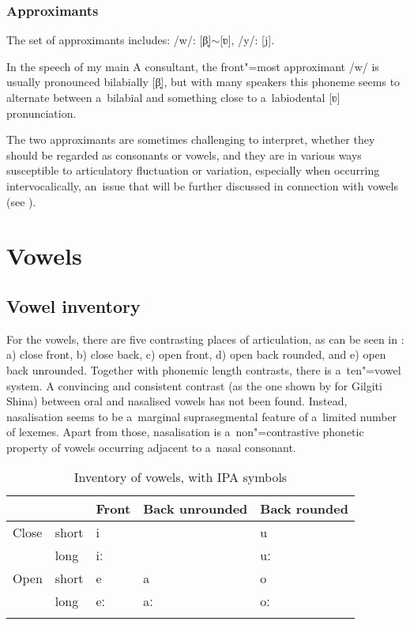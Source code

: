 \subsubsection*{Approximants}

The set of approximants includes: /w/: [β̞]$\sim$[ʋ], /y/: [j].


In the speech of my main A consultant, the front"=most approximant /w/ is usually pronounced bilabially [β̞], but with many speakers this phoneme seems to alternate between a~bilabial and something close to a~labiodental [ʋ] pronunciation.


The two approximants are sometimes challenging to interpret, whether they should be regarded as consonants or vowels, and they are in various ways susceptible to articulatory fluctuation or variation, especially when occurring intervocalically, an~issue that will be further discussed in connection with vowels (see ).


\section{Vowels}
\label{sec:3-2}

\subsection{Vowel inventory}

For the vowels, there are five contrasting places of articulation, as can be seen in : a) close front, b) close back, c) open front, d) open back rounded, and e) open back unrounded. Together with phonemic length contrasts, there is a~ten"=vowel system. A convincing and consistent contrast (as the one shown by \citet[19]{radloff1999} for Gilgiti Shina) between oral and nasalised vowels has not been found. Instead, nasalisation seems to be a~marginal suprasegmental feature of a~limited number of lexemes. Apart from those, nasalisation is a~non"=contrastive phonetic property of vowels occurring adjacent to a~nasal consonant. 



\begin{table}[ht]
\caption{Inventory of vowels, with IPA symbols}
\begin{tabularx}{\textwidth}{ Q Q Q Q Q }
\lsptoprule
&
&
Front
&
Back unrounded &
Back rounded \\\hline
Close &
short &
i &
&
u\\
&
long &
iː &
&
uː\\
Open &
short &
e &
a &
o\\
&
long &
eː &
aː &
oː\\\lspbottomrule
\end{tabularx}
\label{tab:3-3}
\end{table}

